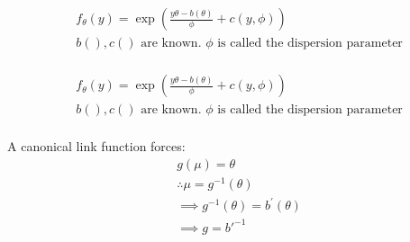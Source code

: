 \newcommand{\vzero}{\mathbf{0}}
\newcommand{\vone}{\mathbf{1}}
\newcommand{\thetac}{\mathrm{\theta^{(0)}}}


\newcommand{\mA}{\mathds{A}} \newcommand{\mB}{\mathds{B}} \newcommand{\mC}{\mathds{C}} \newcommand{\mD}{\mathds{D}} \newcommand{\mE}{\mathds{E}} \newcommand{\mF}{\mathds{F}} \newcommand{\mG}{\mathds{G}} \newcommand{\mH}{\mathds{H}} \newcommand{\mI}{\mathds{I}} \newcommand{\mJ}{\mathds{J}} \newcommand{\mK}{\mathds{K}} \newcommand{\mL}{\mathds{L}} \newcommand{\mM}{\mathds{M}} \newcommand{\mN}{\mathds{N}} \newcommand{\mO}{\mathds{O}} \newcommand{\mP}{\mathds{P}} \newcommand{\mQ}{\mathds{Q}} \newcommand{\mR}{\mathds{R}} \newcommand{\mS}{\mathds{S}} \newcommand{\mT}{\mathds{T}} \newcommand{\mU}{\mathds{U}} \newcommand{\mV}{\mathds{V}} \newcommand{\mW}{\mathds{W}} \newcommand{\mX}{\mathds{X}} \newcommand{\mY}{\mathds{Y}} \newcommand{\mZ}{\mathds{Z}}

\newcommand{\msigma}{\Sigma}
\newcommand{\mbeta}{\mathds{B}}

\newcommand{\argmax}{\mathop{\mathrm{argmax}}}
\newcommand{\argmin}{\mathop{\mathrm{argmin}}}


\begin {equation} \begin {split} 
& f_\theta(y) = \exp (\frac {y \theta - b(\theta)} {\phi} + c(y, \phi)) \\
& b(), c() \text { are known. $\phi$ is called the dispersion parameter} \\
\end {split} \end {equation}

\begin {equation} \begin {split} 
& f_\theta(y) = \exp (\frac {y \theta - b(\theta)} {\phi} + c(y, \phi)) \\
& b(), c() \text { are known. $\phi$ is called the dispersion parameter} \\
\end {split} \end {equation}

A canonical link function forces:
\begin {equation} \begin {split}
& g(\mu) = \theta \\
& \therefore \mu = g^{-1}(\theta) \\
& \implies g^{-1}(\theta) =  b^{'}(\theta) \\
& \implies g = b{'}^{-1} \\
\end {split} \end {equation}

